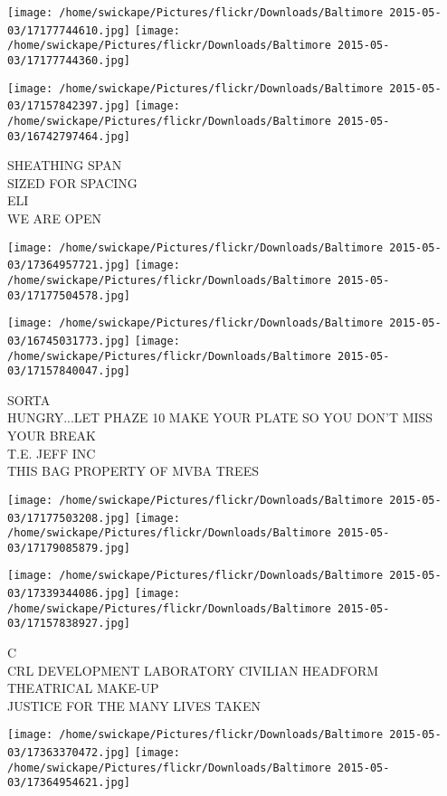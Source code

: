 \documentclass[10pt,letterpaper]{article}
\begin{document}
\texttt{[image: /home/swickape/Pictures/flickr/Downloads/Baltimore 2015-05-03/17177744610.jpg]}
\texttt{[image: /home/swickape/Pictures/flickr/Downloads/Baltimore 2015-05-03/17177744360.jpg]}

\texttt{[image: /home/swickape/Pictures/flickr/Downloads/Baltimore 2015-05-03/17157842397.jpg]}
\texttt{[image: /home/swickape/Pictures/flickr/Downloads/Baltimore 2015-05-03/16742797464.jpg]}

SHEATHING SPAN\\
SIZED FOR SPACING\\
ELI\\
WE ARE OPEN\\
\pagebreak

\texttt{[image: /home/swickape/Pictures/flickr/Downloads/Baltimore 2015-05-03/17364957721.jpg]}
\texttt{[image: /home/swickape/Pictures/flickr/Downloads/Baltimore 2015-05-03/17177504578.jpg]}

\texttt{[image: /home/swickape/Pictures/flickr/Downloads/Baltimore 2015-05-03/16745031773.jpg]}
\texttt{[image: /home/swickape/Pictures/flickr/Downloads/Baltimore 2015-05-03/17157840047.jpg]}

SORTA\\
HUNGRY...LET PHAZE 10 MAKE YOUR PLATE SO YOU DON'T MISS YOUR BREAK\\
T.E. JEFF INC\\
THIS BAG PROPERTY OF MVBA TREES\\
\pagebreak

\texttt{[image: /home/swickape/Pictures/flickr/Downloads/Baltimore 2015-05-03/17177503208.jpg]}
\texttt{[image: /home/swickape/Pictures/flickr/Downloads/Baltimore 2015-05-03/17179085879.jpg]}

\texttt{[image: /home/swickape/Pictures/flickr/Downloads/Baltimore 2015-05-03/17339344086.jpg]}
\texttt{[image: /home/swickape/Pictures/flickr/Downloads/Baltimore 2015-05-03/17157838927.jpg]}

C\\
CRL DEVELOPMENT LABORATORY CIVILIAN HEADFORM\\
THEATRICAL MAKE{-}UP\\
JUSTICE FOR THE MANY LIVES TAKEN\\
\pagebreak

\texttt{[image: /home/swickape/Pictures/flickr/Downloads/Baltimore 2015-05-03/17363370472.jpg]}
\texttt{[image: /home/swickape/Pictures/flickr/Downloads/Baltimore 2015-05-03/17364954621.jpg]}
\end{document}

